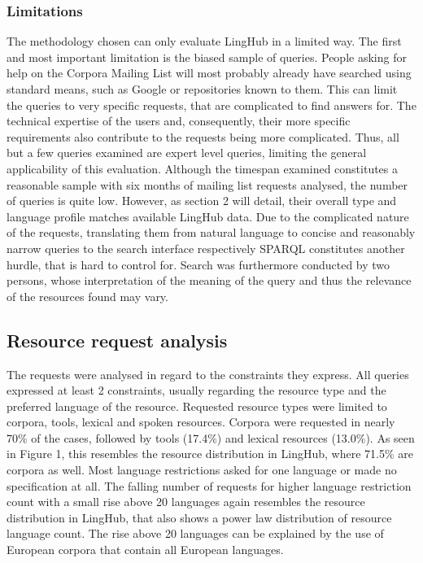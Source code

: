 \documentclass[smallextended]{svjour3}       %
\begin{document}
\subsubsection{Limitations}

The methodology chosen can only evaluate LingHub in a limited way. The first and
most important limitation is the biased sample of queries. People asking for
help on the Corpora Mailing List will most probably already have searched using
standard means, such as Google or repositories known to them. This can limit the
queries to very specific requests, that are complicated to find answers for. The
technical expertise of the users and, consequently, their more specific
requirements also contribute to the requests being more complicated. Thus, all
but a few queries examined are expert level queries, limiting the general
applicability of this evaluation. 
Although the timespan examined constitutes a reasonable sample with six months
of mailing list requests analysed, the number of queries is quite low. However,
as section 2 will detail, their overall type and language profile matches
available LingHub data.
Due to the complicated nature of the requests, translating them from natural
language to concise and reasonably narrow queries to the search interface
respectively SPARQL constitutes another hurdle, that is hard to control for. 
Search was furthermore conducted by two persons, whose interpretation of the
meaning of the query and thus the relevance of the resources found may vary. 

\subsection{Resource request analysis}

The requests were analysed in regard to the constraints they express. All
queries expressed at least 2 constraints, usually regarding the resource type
and the preferred language of the resource. Requested resource types were
limited to corpora, tools, lexical and spoken resources. Corpora were requested
in nearly 70\% of the cases, followed by tools (17.4\%) and lexical resources
(13.0\%). As seen in Figure 1, this resembles the resource distribution in
LingHub, where 71.5\% are corpora as well. 
Most language restrictions asked for one language or made no specification at
all. The falling number of requests for higher language restriction count with a
small rise above 20 languages again resembles the resource distribution in
LingHub, that also shows a power law distribution of resource language count.
The rise above 20 languages can be explained by the use of European corpora that
contain all European languages.  
\end{document}
